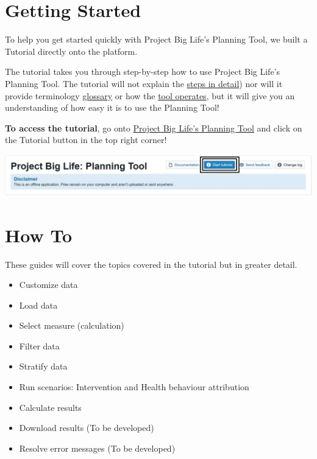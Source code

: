\documentclass[]{book}
\providecommand{\tightlist}{%
  \setlength{\itemsep}{0pt}\setlength{\parskip}{0pt}}
\begin{document}
\chapter{Getting Started}\label{getting-started}

To help you get started quickly with Project Big Life's Planning Tool,
we built a Tutorial directly onto the platform.

The tutorial takes you through step-by-step how to use Project Big
Life's Planning Tool. The tutorial will not explain the
\protect\hyperlink{howto}{steps in detail}) nor will it provide
terminology \protect\hyperlink{glossary}{glossary} or how the
\protect\hyperlink{mport}{tool operates}, but it will give you an
understanding of how easy it is to use the Planning Tool!

\textbf{To access the tutorial}, go onto
\href{http://planning.projectbiglife.ca/}{Project Big Life's Planning
Tool} and click on the Tutorial button in the top right corner!

\begin{center}\includegraphics{Images/Tutorial Button} \end{center}

\hypertarget{howto}{\chapter{How To}\label{howto}}

These guides will cover the topics covered in the tutorial but in
greater detail.

\begin{itemize}
\tightlist
\item
  Customize data
\item
  Load data
\item
  Select measure (calculation)
\item
  Filter data
\item
  Stratify data
\item
  Run scenarios: Intervention and Health behaviour attribution
\item
  Calculate results
\item
  Download results (To be developed)
\item
  Resolve error messages (To be developed)
\end{itemize}
\end{document}

